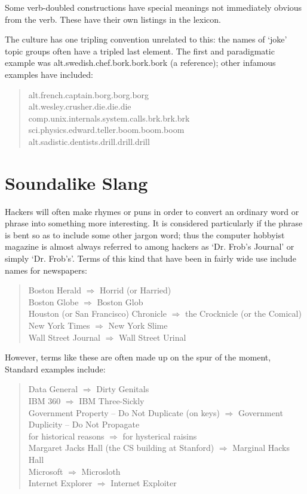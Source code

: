 	Some verb-doubled constructions have special meanings not immediately obvious from the verb. These have their own listings in the
	lexicon.

	The  culture has one tripling convention unrelated to this: the names of `joke' topic groups often have a tripled
	last element. The first and paradigmatic example was alt.swedish.chef.bork.bork.bork (a  reference); other
	infamous examples have included:

	\begin{quote}
		alt.french.captain.borg.borg.borg\\
		alt.wesley.crusher.die.die.die\\
		comp.unix.internals.system.calls.brk.brk.brk\\
		sci.physics.edward.teller.boom.boom.boom\\
		alt.sadistic.dentists.drill.drill.drill
	\end{quote}


\section*{Soundalike Slang}\label{Soundalike-Slang}

	Hackers will often make rhymes or puns in order to convert an ordinary word or phrase into something more interesting. It is considered
	particularly  if the phrase is bent so as to include some other jargon word; thus the computer hobbyist magazine
	 is almost always referred to among hackers as `Dr. Frob's Journal' or simply `Dr. Frob's'. Terms of
	this kind that have been in fairly wide use include names for newspapers:

	\begin{quote}
		Boston Herald $\Rightarrow$ Horrid (or Harried)\\
		Boston Globe $\Rightarrow$ Boston Glob\\
		Houston (or San Francisco) Chronicle $\Rightarrow$ the Crocknicle (or the Comical)\\
		New York Times $\Rightarrow$ New York Slime\\
		Wall Street Journal $\Rightarrow$ Wall Street Urinal
	\end{quote}

	However, terms like these are often made up on the spur of the moment, Standard examples include:

	\begin{quote}
		Data General $\Rightarrow$ Dirty Genitals\\
		IBM 360 $\Rightarrow$ IBM Three-Sickly\\
		Government Property -- Do Not Duplicate (on keys) $\Rightarrow$ Government Duplicity -- Do Not Propagate\\
		for historical reasons $\Rightarrow$ for hysterical raisins\\
		Margaret Jacks Hall (the CS building at Stanford) $\Rightarrow$ Marginal Hacks Hall\\
		Microsoft $\Rightarrow$ Microsloth\\
		Internet Explorer $\Rightarrow$ Internet Exploiter
	\end{quote}

